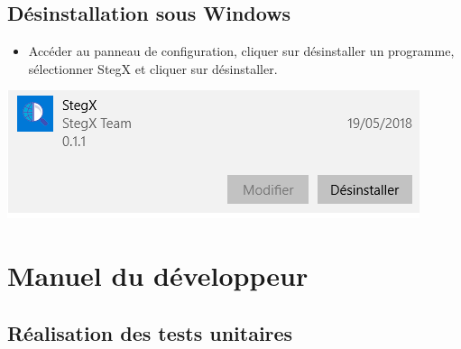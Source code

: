 \documentclass[11pt]{article}
\begin{document}
\subsection{Désinstallation sous Windows}

\begin{itemize}
\item Accéder au panneau de configuration, cliquer sur désinstaller un programme,
sélectionner StegX et cliquer sur désinstaller.
\end{itemize}

\hspace{3cm}
\includegraphics[scale=0.6]{pictures/desinstall.png}
\newpage

\section{Manuel du développeur}

\subsection{Réalisation des tests unitaires}
\end{document}
